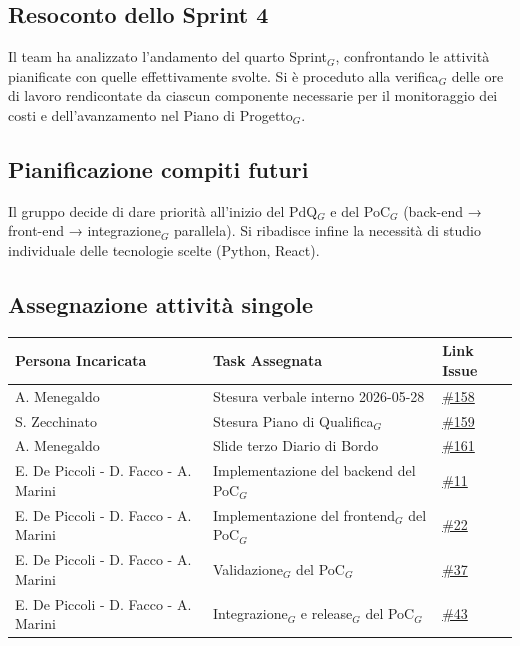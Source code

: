 \documentclass[a4paper, 10pt, colorlinks=true, linkcolor=black, urlcolor=blue, citecolor=blue, hidelinks]{article}
\newcommand{\issue}[1]{\href{https://github.com/thebitless-group-swe/thebitless.github.io/issues/#1}{\##1}}
\begin{document}
\subsection{Resoconto dello Sprint 4}
Il team ha analizzato l'andamento del quarto Sprint$_G$, confrontando le attività pianificate con quelle effettivamente svolte. Si è proceduto alla verifica$_G$ delle ore di lavoro rendicontate da ciascun componente necessarie per il monitoraggio dei costi e dell'avanzamento nel Piano di Progetto$_G$.

\subsection{Pianificazione compiti futuri}
Il gruppo decide di dare priorità all'inizio del PdQ$_G$ e del PoC$_G$ (back-end → front-end → integrazione$_G$ parallela). Si ribadisce infine la necessità di studio individuale delle tecnologie scelte (Python, React).

\subsection{Assegnazione attività singole}
\begin{center}
    \renewcommand{\arraystretch}{1.4}
        \begin{tabular}{|p{4.2cm}|p{6.2cm}|p{2.2cm}|}
        \hline
        \textbf{Persona Incaricata} & \textbf{Task Assegnata} & \centering\textbf{Link Issue} \tabularnewline
        \hline
        A. Menegaldo & Stesura verbale interno 2026-05-28 & \issue{158} \\
        \hline
        S. Zecchinato & Stesura Piano di Qualifica$_G$ & \issue{159} \\
        \hline
        A. Menegaldo & Slide terzo Diario di Bordo & \issue{161} \\
        \hline
        E. De Piccoli - D. Facco - A. Marini & Implementazione del backend del PoC$_G$ & \issue{11} \\
        \hline
        E. De Piccoli - D. Facco - A. Marini & Implementazione del frontend$_G$ del PoC$_G$ & \issue{22} \\
        \hline
        E. De Piccoli - D. Facco - A. Marini & Validazione$_G$ del PoC$_G$ & \issue{37} \\
        \hline
        E. De Piccoli - D. Facco - A. Marini & Integrazione$_G$ e release$_G$ del PoC$_G$ & \issue{43} \\
        \hline
    \end{tabular}
\end{center}

\appendix
\end{document}
